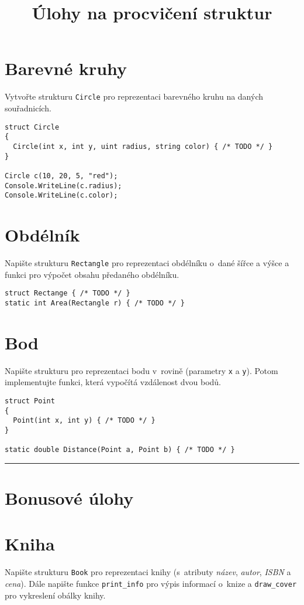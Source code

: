 \documentclass[12pt,a4paper]{article}
\begin{document}
\pagestyle{empty}
\title{Úlohy na procvičení struktur}
\date{\vspace{-12ex}}
\setlength{\droptitle}{-6em}
\maketitle

\section{Barevné kruhy}

Vytvořte strukturu \texttt{Circle} pro reprezentaci barevného kruhu na daných
souřadnicích.

\begin{verbatim}
struct Circle
{
  Circle(int x, int y, uint radius, string color) { /* TODO */ }
}

Circle c(10, 20, 5, "red");
Console.WriteLine(c.radius);
Console.WriteLine(c.color);
\end{verbatim}


\section{Obdélník}

Napište strukturu \texttt{Rectangle} pro reprezentaci obdélníku o dané šířce a
výšce a funkci pro výpočet obsahu předaného obdélníku.

\begin{verbatim}
struct Rectange { /* TODO */ }
static int Area(Rectangle r) { /* TODO */ }
\end{verbatim}


\section{Bod}

Napište strukturu pro reprezentaci bodu v rovině (parametry \texttt{x} a
\texttt{y}). Potom implementujte funkci, která vypočítá vzdálenost dvou bodů.

\begin{verbatim}
struct Point
{
  Point(int x, int y) { /* TODO */ }
}

static double Distance(Point a, Point b) { /* TODO */ }
\end{verbatim}


\noindent\rule{\textwidth}{1pt}
\section*{Bonusové úlohy}

\section{Kniha}

Napište strukturu \texttt{Book} pro reprezentaci knihy (s atributy
\textit{název}, \textit{autor}, \textit{ISBN} a \textit{cena}).  Dále napište
funkce \texttt{print\_info} pro výpis informací o knize a \texttt{draw\_cover}
pro vykreslení obálky knihy.
\end{document}
